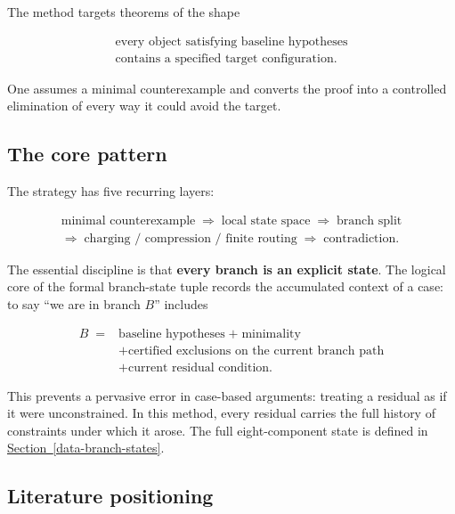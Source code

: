 \documentclass[
  11pt,
]{article}
\theoremstyle{definition}
\newcommand{\secref}[1]{\hyperref[#1]{Section~\ref*{#1}}}
\begin{document}
The method targets theorems of the shape

\[
\begin{gathered}
\text{every object satisfying baseline hypotheses}\\
\text{contains a specified target configuration.}
\end{gathered}
\]

One assumes a minimal counterexample and converts the proof into a
controlled elimination of every way it could avoid the target.

\subsection{The core pattern}\label{the-core-pattern}

The strategy has five recurring layers:

\[
\boxed{
\begin{gathered}
\text{minimal counterexample}
\;\Rightarrow\;
\text{local state space}
\;\Rightarrow\;
\text{branch split}\\
\Rightarrow\;
\text{charging / compression / finite routing}
\;\Rightarrow\;
\text{contradiction}.
\end{gathered}
}
\]



The essential discipline is that \textbf{every branch is an explicit
state}. The logical core of the formal branch-state tuple records the
accumulated context of a case: to say ``we are in branch \(B\)'' includes

\[
\begin{aligned}
B \;={}& \text{baseline hypotheses} \;+\; \text{minimality}\\
&+ \text{certified exclusions on the current branch path}\\
&+ \text{current residual condition}.
\end{aligned}
\]

This prevents a pervasive error in case-based arguments: treating a
residual as if it were unconstrained. In this method, every residual
carries the full history of constraints under which it arose. The full
eight-component state is defined in \secref{data-branch-states}.

\subsection{Literature positioning}\label{literature-positioning}
\end{document}
